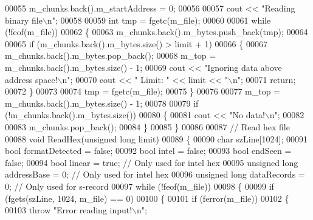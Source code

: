 \begin{DoxyCode}
00055         m\_chunks.back().m\_startAddress = 0;
00056 
00057         cout << \textcolor{stringliteral}{"Reading binary file\(\backslash\)n"};
00058 
00059         \textcolor{keywordtype}{int} tmp = fgetc(m\_file);
00060 
00061         \textcolor{keywordflow}{while} (!feof(m\_file))
00062         \{
00063             m\_chunks.back().m\_bytes.push\_back(tmp);
00064 
00065             \textcolor{keywordflow}{if} (m\_chunks.back().m\_bytes.size() > limit + 1)
00066             \{
00067                 m\_chunks.back().m\_bytes.pop\_back();
00068                 m\_top = m\_chunks.back().m\_bytes.size() - 1;
00069                 cout << \textcolor{stringliteral}{"Ignoring data above address space!\(\backslash\)n"};
00070                 cout << \textcolor{stringliteral}{" Limit: "} << limit << \textcolor{stringliteral}{"\(\backslash\)n"};
00071                 \textcolor{keywordflow}{return};
00072             \}
00073 
00074             tmp = fgetc(m\_file);
00075         \}
00076 
00077         m\_top = m\_chunks.back().m\_bytes.size() - 1;
00078 
00079         \textcolor{keywordflow}{if} (!m\_chunks.back().m\_bytes.size())
00080         \{
00081             cout << \textcolor{stringliteral}{"No data!\(\backslash\)n"};
00082 
00083             m\_chunks.pop\_back();
00084         \}
00085     \}
00086 
00087     \textcolor{comment}{// Read hex file}
00088     \textcolor{keywordtype}{void} ReadHex(\textcolor{keywordtype}{unsigned} \textcolor{keywordtype}{long} limit)
00089     \{
00090         \textcolor{keywordtype}{char} szLine[1024];
00091         \textcolor{keywordtype}{bool} formatDetected = \textcolor{keyword}{false};
00092         \textcolor{keywordtype}{bool} intel = \textcolor{keyword}{false};
00093         \textcolor{keywordtype}{bool} endSeen = \textcolor{keyword}{false};
00094         \textcolor{keywordtype}{bool} linear = \textcolor{keyword}{true};             \textcolor{comment}{// Only used for intel hex}
00095         \textcolor{keywordtype}{unsigned} \textcolor{keywordtype}{long} addressBase = 0;  \textcolor{comment}{// Only used for intel hex}
00096         \textcolor{keywordtype}{unsigned} \textcolor{keywordtype}{long} dataRecords = 0;  \textcolor{comment}{// Only used for s-record}
00097         \textcolor{keywordflow}{while} (!feof(m\_file))
00098         \{
00099             \textcolor{keywordflow}{if} (fgets(szLine, 1024, m\_file) == 0)
00100             \{
00101                 \textcolor{keywordflow}{if} (ferror(m\_file))
00102                 \{
00103                     \textcolor{keywordflow}{throw} \textcolor{stringliteral}{"Error reading input!\(\backslash\)n"};

\end{DoxyCode}
